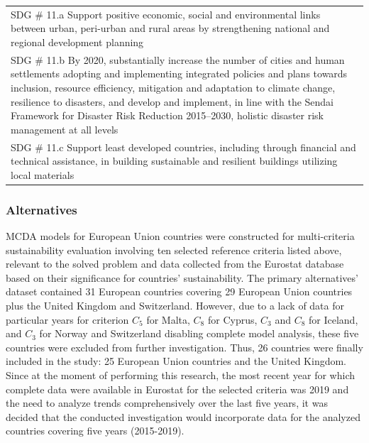 \documentclass[5p,times]{elsarticle}
\begin{document}
\begin{table}[ht!]
{\begin{tabular}{
>{\raggedright\arraybackslash}p{16cm}
}
SDG \# 11.a Support positive economic, social and environmental links between urban, peri-urban and rural areas by strengthening national and regional development planning \\
SDG \# 11.b By 2020, substantially increase the number of cities and human settlements adopting and implementing integrated policies and plans towards inclusion, resource efficiency, mitigation and adaptation to climate change, resilience to disasters, and develop and implement, in line with the Sendai Framework for Disaster Risk Reduction 2015–2030, holistic disaster risk management at all levels \\
SDG \# 11.c Support least developed countries, including through financial and technical assistance, in building sustainable and resilient buildings utilizing local materials
\end{tabular}
}
\end{table}

\normalsize	
\subsubsection{Alternatives}
\label{sec:ModelAlternatives}
MCDA models for European Union countries were constructed for multi-criteria sustainability evaluation involving ten selected reference criteria listed above, relevant to the solved problem and data collected from the Eurostat database~\cite{eurostat2021} based on their significance for countries' sustainability. The primary alternatives' dataset contained 31 European countries covering 29 European Union countries plus the United Kingdom and Switzerland. However, due to a lack of data for particular years for criterion $C_{5}$ for Malta, $C_{8}$ for Cyprus, $C_{3}$ and $C_{8}$ for Iceland, and $C_{3}$ for Norway and Switzerland disabling complete model analysis, these five countries were excluded from further investigation. Thus, 26 countries were finally included in the study: 25 European Union countries and the United Kingdom. Since at the moment of performing this research, the most recent year for which complete data were available in Eurostat for the selected criteria was 2019 and the need to analyze trends comprehensively over the last five years, it was decided that the conducted investigation would incorporate data for the analyzed countries covering five years (2015-2019).
%
\end{document}
